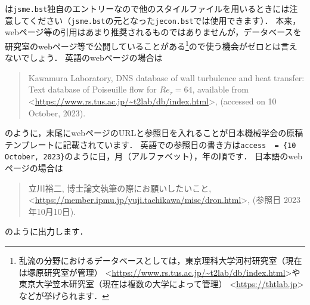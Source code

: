 \documentclass[a4paper,fleqn,uplatex,dvipdfmx]{jsarticle}
\newcommand{\jsmefile}{\texttt{jsme.bst}}
\begin{document}
\ttonline は\jsmefile 独自のエントリーなので他の\BibTeX{}スタイルファイルを用いるときには注意してください（\jsmefile の元となった\verb|jecon.bst|では使用できます）．
本来，webページ等の引用はあまり推奨されるものではありませんが，データベースを研究室のwebページ等で公開していることがある\footnote{乱流の分野におけるデータベースとしては，東京理科大学河村研究室（現在は塚原研究室が管理） \textless\url{https://www.rs.tus.ac.jp/~t2lab/db/index.html}\textgreater や東京大学笠木研究室（現在は複数の大学によって管理） \textless\url{https://thtlab.jp}\textgreater などが挙げられます．}ので使う機会がゼロとは言えないでしょう．
英語のwebページの場合は
\renewcommand\UrlFont{\rmfamily}
\begin{quote}
    Kawamura Laboratory, DNS database of wall turbulence and heat transfer: Text database of Poiseuille flow for $\mathit{Re}_\tau = 64$, available from \textless\url{https://www.rs.tus.ac.jp/~t2lab/db/index.html}\textgreater, (accessed on 10 October, 2023).
\end{quote}
のように，末尾にwebページのURLと参照日を入れることが日本機械学会の原稿テンプレートに記載されています．
英語での参照日の書き方は\verb|access  = {10 October, 2023}|のように日，月（アルファベット），年の順です．
日本語のwebページの場合は
\begin{quote}
    立川裕二, 博士論文執筆の際にお願いしたいこと, \textless\url{https://member.ipmu.jp/yuji.tachikawa/misc/dron.html}\textgreater, (参照日 2023年10月10日).
\end{quote}
\renewcommand\UrlFont{\ttfamily}
のように出力します．
\end{document}
